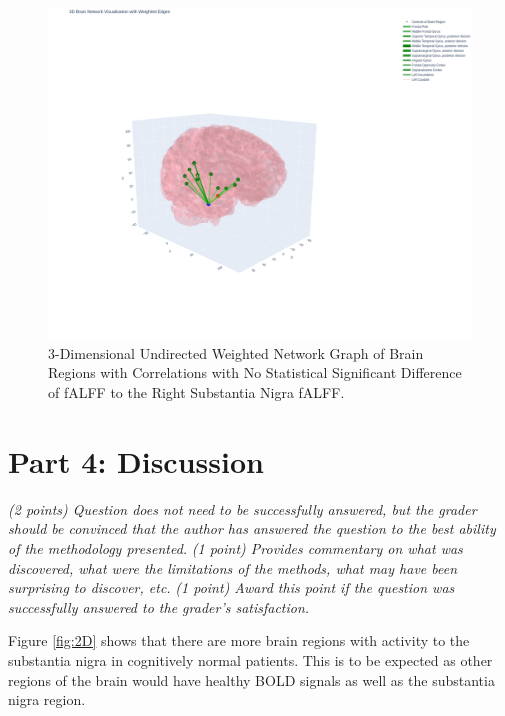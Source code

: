 \documentclass[12pt]{article}
\begin{document}
\begin{figure}[h]  %
    \centering
    \includegraphics[width=\textwidth]{"../img/3D_Plot_of_Correlated_fALFF.png"}  %
    \caption{3-Dimensional Undirected Weighted Network Graph of Brain Regions with Correlations with No Statistical Significant Difference of fALFF to the Right Substantia Nigra fALFF.}
    \label{fig:3D}  %
\end{figure}

\FloatBarrier

\section{Part 4: Discussion}
\textit{(2 points) Question does not need to be successfully answered, but the grader should be convinced that the author has answered the question to the best ability of the methodology presented.}
\textit{(1 point) Provides commentary on what was discovered, what were the limitations of the methods, what may have been surprising to discover, etc.}
\textit{(1 point) Award this point if the question was successfully answered to the grader's satisfaction. }

Figure \ref{fig:2D} shows that there are more brain regions with activity to the substantia nigra in cognitively normal patients. This is to be expected as other regions of the brain would have healthy BOLD signals as well as the substantia nigra region. 
\end{document}
